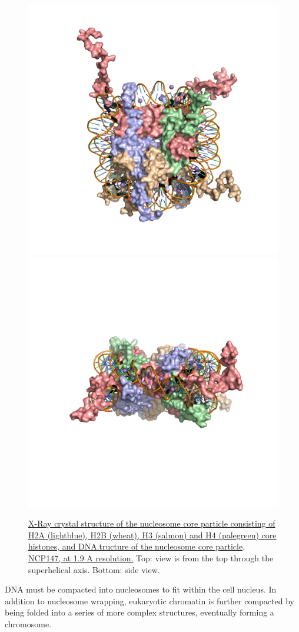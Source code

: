 \begin{figure}

{\centering \includegraphics[width=0.7\linewidth]{./figures/dna/nucleosome_top} \includegraphics[width=0.7\linewidth]{./figures/dna/nucleosome_side} 

}

\caption{\href{https://www.rcsb.org/structure/1KX5}{X-Ray crystal structure of the nucleosome core particle consisting of H2A (lightblue), H2B (wheat), H3 (salmon) and H4 (palegreen) core histones, and DNA.tructure of the nucleosome core particle, NCP147, at 1.9 A resolution.} Top: view is from the top through the superhelical axis. Bottom: side view.}\label{fig:nucleosome}
\end{figure}

DNA must be compacted into nucleosomes to fit within the cell nucleus. In addition to nucleosome wrapping, eukaryotic chromatin is further compacted by being folded into a series of more complex structures, eventually forming a chromosome.

